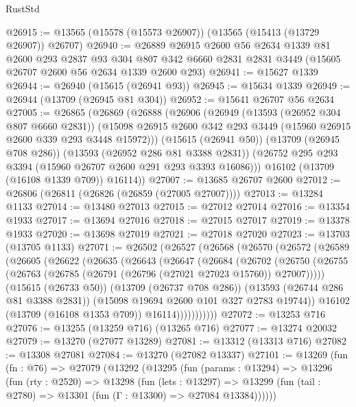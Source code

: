 \begin{lexlean}{RustStd}
\begin{coremodule}
@26915 := @13565 (@15578 (@15573 @26907)) (@13565 (@15413 (@13729 @26907)) @26707)
@26940 := @26889
    @26915
    @2600
    @56
    @2634
    @1339
    @81
    @2600
    @293
    @2837
    @93
    @304
    @807
    @342
    @6660
    @2831
    @2831
    @3449
    (@15605 @26707 @2600 @56 @2634 @1339 @2600 @293)
@26941 := @15627 @1339
@26944 := @26940 (@15615 (@26941 @93))
@26945 := @15634 @1339
@26949 := @26944 (@13709 (@26945 @81 @304))
@26952 := @15641 @26707 @56 @2634
@27005 := @26865
    (@26869
      (@26888
        (@26906
          (@26949
            (@13593 (@26952 @304 @807 @6660 @2831))
            (@15098 @26915 @2600 @342 @293 @3449 (@15960 @26915 @2600 @339 @293 @3448 @15972)))
          (@15615 (@26941 @50))
          (@13709 (@26945 @708 @286))
          (@13593 (@26952 @286 @81 @3388 @2831))
          (@26752 @295 @293 @3394 (@15960 @26707 @2600 @291 @293 @3393 @16086)))
        @16102
        (@13709 (@16108 @1339 @709))
        @16114))
@27007 := @13685 @26707 @2600
@27012 := @26806 (@26811 (@26826 (@26859 (@27005 @27007))))
@27013 := @13284 @1133
@27014 := @13480 @27013
@27015 := @27012 @27014
@27016 := @13354 @1933
@27017 := @13694 @27016
@27018 := @27015 @27017
@27019 := @13378 @1933
@27020 := @13698 @27019
@27021 := @27018 @27020
@27023 := @13703 (@13705 @1133)
@27071 := @26502
    (@26527
      (@26568
        (@26570
          (@26572
            (@26589
              (@26605
                (@26622
                  (@26635
                    (@26643
                      (@26647
                        (@26684
                          (@26702
                            (@26750
                              (@26755
                                (@26763 (@26785 (@26791 (@26796 (@27021 @27023 @15760)) @27007)))))
                            (@15615 (@26733 @50))
                            (@13709 (@26737 @708 @286))
                            (@13593 (@26744 @286 @81 @3388 @2831))
                            (@15098 @19694 @2600 @101 @327 @2783 @19744))
                          @16102
                          (@13709 (@16108 @1353 @709))
                          @16114)))))))))))
@27072 := @13253 @716
@27076 := @13255 (@13259 @716) (@13265 @716)
@27077 := @13274 @20032
@27079 := @13270 (@27077 @13289)
@27081 := @13312 (@13313 @716)
@27082 := @13308 @27081
@27084 := @13270 (@27082 @13337)
@27101 := @13269
    (fun (fn : @76) =>
    @27079
      (@13292
        (@13295
          (fun (params : @13294) =>
          @13296
            (fun (rty : @2520) =>
            @13298
              (fun (lets : @13297) =>
              @13299 (fun (tail : @2780) => @13301 (fun (Γ : @13300) => @27084 @13384))))))

\end{coremodule}
\end{lexlean}
